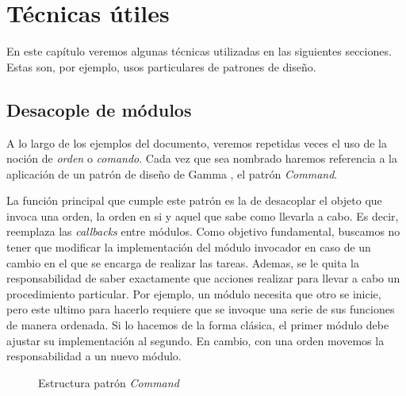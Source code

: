 %
%


\chapter{Técnicas útiles}
En este capítulo veremos algunas técnicas utilizadas en las siguientes secciones. Estas son, por ejemplo, usos particulares de patrones de diseño.


\section{Desacople de módulos}

A lo largo de los ejemplos del documento, veremos repetidas veces el uso de la noción de \textit{orden} o \textit{comando}. Cada vez que sea nombrado haremos referencia a la aplicación de un patrón de diseño de Gamma \cite{Gamma:1995:DPE:186897}, el patrón \textit{Command}. 

La función principal que cumple este patrón es la de desacoplar el objeto que invoca una orden, la orden en si y aquel que sabe como llevarla a cabo. Es decir, reemplaza las \textit{callbacks} entre módulos. Como objetivo fundamental, buscamos no tener que modificar la implementación del módulo invocador en caso de un cambio en el que se encarga de realizar las tareas. Ademas, se le quita la responsabilidad de saber exactamente que acciones realizar para llevar a cabo un procedimiento particular. Por ejemplo, un módulo necesita que otro se inicie, pero este ultimo para hacerlo requiere que se invoque una serie de sus funciones de manera ordenada. Si lo hacemos de la forma clásica, el primer módulo debe ajustar su implementación al segundo. En cambio, con una orden movemos la responsabilidad a un nuevo módulo.

\begin{figure}
\caption{Estructura patrón \textit{Command}}
\begin{center}
\end{center}
\end{figure}

